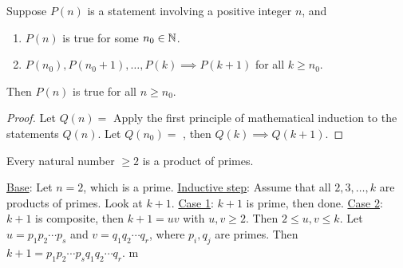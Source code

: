 \documentclass[]{article}
\begin{document}
\begin{theorem}
	 Suppose $P(n)$ is a statement involving a positive integer $n$, and
	\begin{enumerate}
		\item $P(n)$ is true for some $n_0\in\mathbb{N}$.
		\item $P(n_0),P(n_0+1),\dots,P(k)\implies P(k+1)$ for all $k\geq n_0$.
	\end{enumerate}
	Then $P(n)$ is true for all $n\geq n_0$.
\end{theorem}
\begin{proof}
	Let $Q(n) = $  Apply the first principle of mathematical induction to the statements $Q(n)$. Let $Q(n_0) = $ , then $Q(k) \implies Q(k+1)$.
\end{proof}
\begin{example}
	Every natural number $\geq 2$ is a product of primes.
	
	\ul{Base}: Let $n=2$, which is a prime.
	\ul{Inductive step}: Assume that all $2,3,\dots,k$ are products of primes. Look at $k+1$. \ul{Case 1}: $k+1$ is prime, then done. \ul{Case 2}: $k+1$ is composite, then $k+1 = uv$ with $u,v\geq 2$. Then $2\leq u,v\leq k$. Let $u = p_1p_2\cdots p_s$ and $v = q_1q_2\cdots q_r$, where $p_i,q_j$ are primes. Then $k+1 = p_1p_2\cdots p_sq_1q_2\cdots q_r$. m
\end{example}
\end{document}
